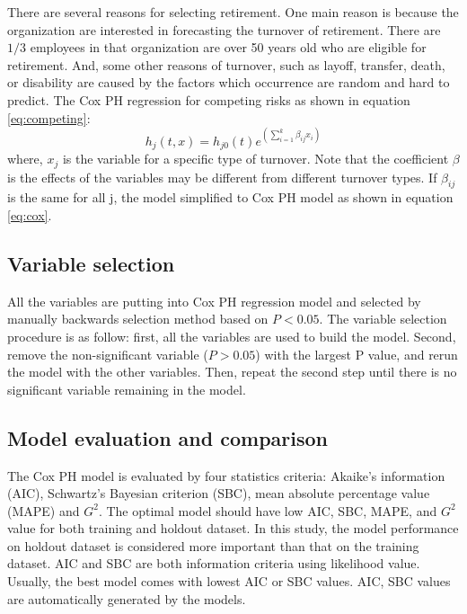 \documentclass[12pt,letterpaper]{article}
\begin{document}
  There are several reasons for selecting retirement. One main reason is because the organization are interested in forecasting the turnover of retirement. There are $1/3$  employees in that organization are over 50 years old who are eligible for retirement. And, some other reasons of turnover, such as layoff, transfer, death, or disability are caused by the factors which occurrence are random and hard to predict. The Cox PH regression for competing risks as shown in equation \ref{eq:competing}:
  \begin{equation}
  \label{eq:competing}
  h_j(t,x)=h_{j0}(t)e^{(\sum_{i=1}^{k}\beta_{ij}x_i)}
  \end{equation}
  where, $x_{j}$ is the variable for a specific type of turnover. Note that the coefficient $\beta$ is the effects of the variables may be different from different turnover types. If $\beta_{ij}$  is the same for all j, the model simplified to Cox PH model as shown in equation \ref{eq:cox}.


\subsection{Variable selection}
All the variables are putting into Cox PH regression model and selected by manually backwards selection method based on $P<0.05$.  The variable selection procedure is as follow: first, all the variables are used to build the model. Second, remove the non-significant variable ($P>0.05$) with the largest P value, and rerun the model with the other variables. Then, repeat the second step until there is no significant variable remaining in the model.
\subsection{Model evaluation and comparison}

The Cox PH model is evaluated by four statistics criteria:  Akaike’s information (AIC), Schwartz’s Bayesian criterion (SBC), mean absolute percentage value (MAPE) and $G^2$. The optimal model should have low AIC, SBC, MAPE, and $G^2$ value for both training and holdout dataset. In this study, the model performance on holdout dataset is considered more important than that on the training dataset.  AIC and SBC are both information criteria using likelihood value. Usually, the best model comes with lowest AIC or SBC values. AIC, SBC values are automatically generated by the models.
\end{document}
